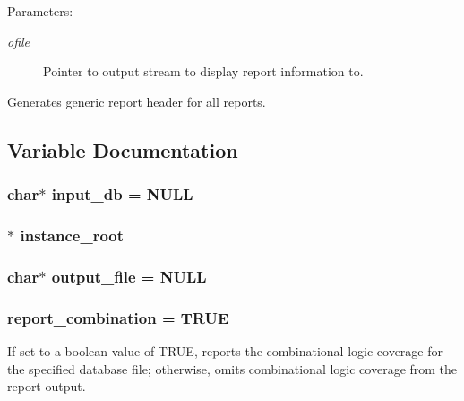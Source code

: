\begin{Desc}
\item[Parameters: ]\par
\begin{description}
\item[{\em 
ofile}]Pointer to output stream to display report information to.\end{description}
\end{Desc}
Generates generic report header for all reports. 

\subsection{Variable Documentation}
\subsubsection{\setlength{\rightskip}{0pt plus 5cm}char$\ast$ input\_\-db = NULL}\label{report_8c_a7}


\subsubsection{$\ast$ instance\_\-root}\label{report_8c_a8}


\subsubsection{\setlength{\rightskip}{0pt plus 5cm}char$\ast$ output\_\-file = NULL}\label{report_8c_a6}


\subsubsection{ report\_\-combination = TRUE}\label{report_8c_a2}


If set to a boolean value of TRUE, reports the combinational logic coverage for the specified database file; otherwise, omits combinational logic coverage from the report output. 
